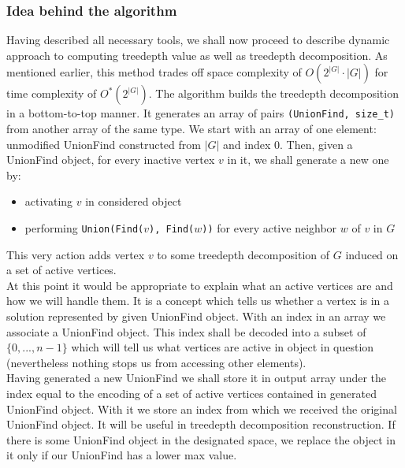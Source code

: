 \subsubsection{Idea behind the algorithm}
Having described all necessary tools, we shall now proceed to describe dynamic approach to computing treedepth value as well as treedepth decomposition. As mentioned earlier, this method trades off space complexity of $O\left(2^{\left|G\right|}\cdot\left|G\right|\right)$ for time complexity of  $O^{*}\left(2^{\left|G\right|}\right)$.
The algorithm builds the treedepth decomposition in a bottom-to-top manner. It generates an array of pairs \texttt{(UnionFind, size\_t)} from another array of the same type. We start with an array of one element: unmodified UnionFind constructed from $\left|G\right|$ and index 0. Then, given a UnionFind object, for every inactive vertex $v$ in it, we shall generate a new one by:
\begin{itemize}
	\item activating $v$ in considered object
	\item performing \texttt{Union(Find($v$), Find($w$))} for every active neighbor $w$ of $v$ in $G$
\end{itemize}
This very action adds vertex $v$ to some treedepth decomposition of $G$ induced on a set of active vertices.\\
At this point it would be appropriate to explain what an active vertices are and how we will handle them. It is a concept which tells us whether a vertex is in a solution represented by given UnionFind object. With an index in an array we associate a UnionFind object. This index shall be decoded into a subset of $\{0,...,n-1\}$ which will tell us what vertices are active in object in question (nevertheless nothing stops us from accessing other elements).\\
Having generated a new UnionFind we shall store it in output array under the index equal to the encoding of a set of active vertices contained in generated UnionFind object. With it we store an index from which we received the original UnionFind object. It will be useful in treedepth decomposition reconstruction. If there is some UnionFind object in the designated space, we replace the object in it only if our UnionFind has a lower max value.
